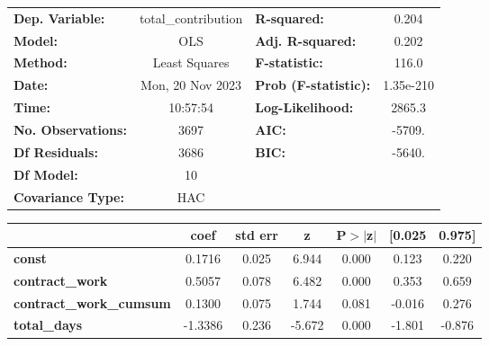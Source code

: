 \begin{center}
\begin{tabular}{lclc}
\toprule
\textbf{Dep. Variable:}                  & total\_contribution & \textbf{  R-squared:         } &     0.204   \\
\textbf{Model:}                          &         OLS         & \textbf{  Adj. R-squared:    } &     0.202   \\
\textbf{Method:}                         &    Least Squares    & \textbf{  F-statistic:       } &     116.0   \\
\textbf{Date:}                           &   Mon, 20 Nov 2023  & \textbf{  Prob (F-statistic):} & 1.35e-210   \\
\textbf{Time:}                           &       10:57:54      & \textbf{  Log-Likelihood:    } &    2865.3   \\
\textbf{No. Observations:}               &          3697       & \textbf{  AIC:               } &    -5709.   \\
\textbf{Df Residuals:}                   &          3686       & \textbf{  BIC:               } &    -5640.   \\
\textbf{Df Model:}                       &            10       & \textbf{                     } &             \\
\textbf{Covariance Type:}                &         HAC         & \textbf{                     } &             \\
\bottomrule
\end{tabular}
\begin{tabular}{lcccccc}
                                         & \textbf{coef} & \textbf{std err} & \textbf{z} & \textbf{P$> |$z$|$} & \textbf{[0.025} & \textbf{0.975]}  \\
\midrule
\textbf{const}                           &       0.1716  &        0.025     &     6.944  &         0.000        &        0.123    &        0.220     \\
\textbf{contract\_work}                  &       0.5057  &        0.078     &     6.482  &         0.000        &        0.353    &        0.659     \\
\textbf{contract\_work\_cumsum}          &       0.1300  &        0.075     &     1.744  &         0.081        &       -0.016    &        0.276     \\
\textbf{total\_days}                     &      -1.3386  &        0.236     &    -5.672  &         0.000        &       -1.801    &       -0.876     \\

\end{tabular}
\end{center}
